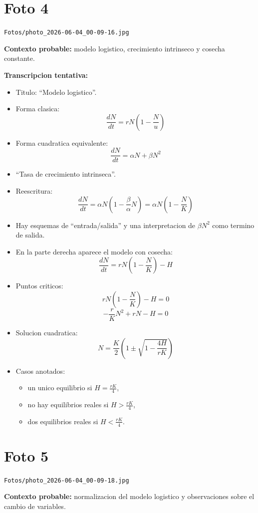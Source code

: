 \documentclass[11pt,letterpaper]{article}
\begin{document}
\section*{Foto 4}
\texttt{Fotos/photo\_2026-06-04\_00-09-16.jpg}

\textbf{Contexto probable:} modelo logistico, crecimiento intrinseco y cosecha constante.

\textbf{Transcripcion tentativa:}
\begin{itemize}[leftmargin=*]
    \item Titulo: ``Modelo logistico''.
    \item Forma clasica:
    \[
    \frac{dN}{dt}=rN\left(1-\frac{N}{u}\right)
    \]
    \item Forma cuadratica equivalente:
    \[
    \frac{dN}{dt}=\alpha N+\beta N^2
    \]
    \item ``Tasa de crecimiento intrinseca''.
    \item Reescritura:
    \[
    \frac{dN}{dt}=\alpha N\left(1-\frac{\beta}{\alpha}N\right)
    =\alpha N\left(1-\frac{N}{K}\right)
    \]
    \item Hay esquemas de ``entrada/salida'' y una interpretacion de \( \beta N^2 \) como termino de salida.
    \item En la parte derecha aparece el modelo con cosecha:
    \[
    \frac{dN}{dt}=rN\left(1-\frac{N}{K}\right)-H
    \]
    \item Puntos criticos:
    \[
    rN\left(1-\frac{N}{K}\right)-H=0
    \]
    \[
    -\frac{r}{K}N^2+rN-H=0
    \]
    \item Solucion cuadratica:
    \[
    N=\frac{K}{2}\left(1\pm \sqrt{1-\frac{4H}{rK}}\right)
    \]
    \item Casos anotados:
    \begin{itemize}
        \item un unico equilibrio si \(H=\frac{rK}{4}\),
        \item no hay equilibrios reales si \(H>\frac{rK}{4}\),
        \item dos equilibrios reales si \(H<\frac{rK}{4}\).
    \end{itemize}
\end{itemize}

\section*{Foto 5}
\texttt{Fotos/photo\_2026-06-04\_00-09-18.jpg}

\textbf{Contexto probable:} normalizacion del modelo logistico y observaciones sobre el cambio de variables.
\end{document}
